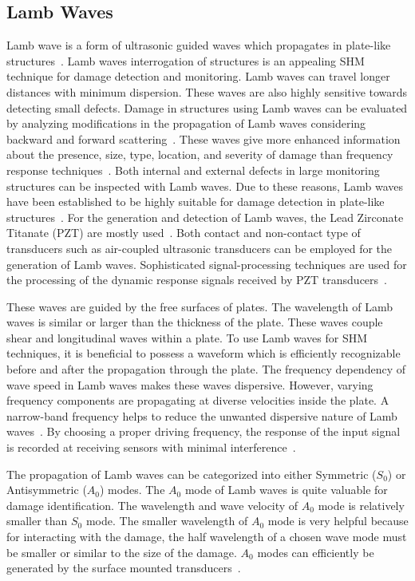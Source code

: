 \documentclass[b5paper, 11pt, titlepage]{book}
\begin{document}
\subsection{Lamb Waves}

Lamb wave is a form of ultrasonic guided waves which propagates in plate-like structures~\cite{Lamb1917}. Lamb waves interrogation of structures is an appealing SHM technique for damage detection and monitoring. Lamb waves can travel longer distances with minimum dispersion. These waves are also highly sensitive towards detecting small defects. Damage in structures using Lamb waves can be evaluated by analyzing modifications in the propagation of Lamb waves considering backward and forward scattering~\cite{Hameed2019b}. These waves give more enhanced information about the presence, size, type, location, and severity of damage than frequency response techniques~\cite{Kessler2002}. Both internal and external defects in large monitoring structures can be inspected with Lamb waves. Due to these reasons, Lamb waves have been established to be highly suitable for damage detection in plate-like structures~\cite{Kudela2018a}. For the generation and detection of Lamb waves, the Lead Zirconate Titanate (PZT) are mostly used~\cite{Journal}. Both contact and non-contact type of transducers such as air-coupled ultrasonic transducers can be employed for the generation of Lamb waves. Sophisticated signal-processing techniques are used for the processing of the dynamic response signals received by PZT transducers~\cite{Hameed2019a,Su2004}. 

These waves are guided by the free surfaces of plates. The wavelength of Lamb waves is similar or larger than the thickness of the plate. These waves couple shear and longitudinal waves within a plate. To use Lamb waves for SHM techniques, it is beneficial to possess a waveform which is efficiently recognizable before and after the propagation through the plate. The frequency dependency of wave speed in Lamb waves makes these waves dispersive. However, varying frequency components are propagating at diverse velocities inside the plate. A narrow-band frequency helps to reduce the unwanted dispersive nature of Lamb waves~\cite{Kessler2002}. By choosing a proper driving frequency, the response of the input signal is recorded at receiving sensors with minimal interference~\cite{Farrar2012}. 

The propagation of Lamb waves can be categorized into either Symmetric ($S_0$) or Antisymmetric ($A_0$) modes. The $A_0$ mode of Lamb waves is quite valuable for damage identification. The wavelength and wave velocity of $A_0$ mode is relatively smaller than $S_0$ mode. The smaller wavelength of $A_0$ mode is very helpful because for interacting with the damage, the half wavelength of a chosen wave mode must be smaller or similar to the size of the damage. $A_0$ modes can efficiently be generated by the surface mounted transducers~\cite{Ricci2016}.  
\end{document}
